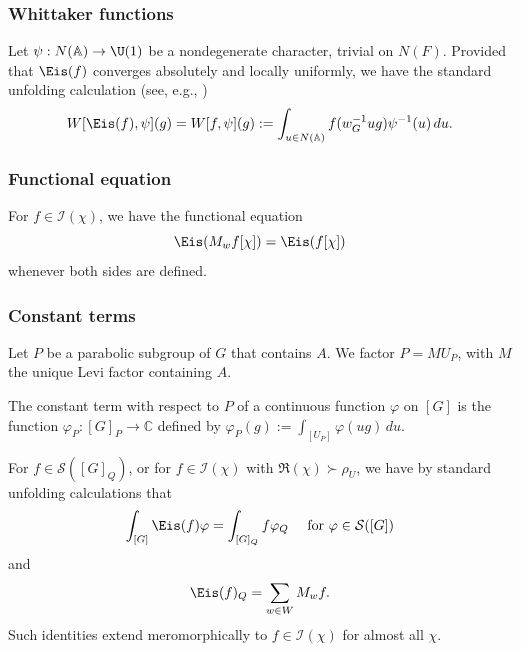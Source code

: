 \subsubsection{Whittaker functions}\label{sec:whittaker-functions}
Let $\psi : N(\mathbb{A}) \rightarrow \U(1)$ be a nondegenerate character, trivial on $N(F)$.  Provided that $\Eis(f)$ converges absolutely and locally uniformly, we have the standard unfolding calculation (see, e.g., \cite[Prop 7.1.3]{MR2683009})
\begin{equation}\label{eq:weisf-psig-=}
  W[\Eis(f),\psi](g) = W[f,\psi](g) := \int_{u \in  N(\mathbb{A})} f(w_G^{-1} u g) \psi^{-1}(u) \, d u.
\end{equation}

\subsubsection{Functional equation}
For $f \in \mathcal{I}(\chi)$, we have the functional equation
\begin{equation}\label{eq:eisenstein-series-functional-equation}
  \Eis(M_w f[\chi]) = \Eis(f[\chi])
\end{equation}
whenever both sides are defined.


\subsubsection{Constant terms}\label{sec:constant-terms}
Let $P$ be a parabolic subgroup of $G$ that contains $A$.  We factor $P = M U_P$, with $M$ the unique Levi factor containing $A$.

The constant term with respect to $P$ of a continuous function $\varphi$ on $[G]$ is the function $\varphi_P : [G]_P \rightarrow \mathbb{C}$ defined by $\varphi_P(g) := \int_{[U_P]} \varphi(u g) \, d u$.


For $f \in \mathcal{S}([G]_Q)$, or for $f \in \mathcal{I}(\chi)$ with $\Re(\chi) \succ \rho_U$, we have by standard unfolding calculations \cite[p101 and \S II.1.7]{MR1361168} that
\begin{equation}\label{eq:int_g-eisf-varphi}
  \int_{[G]} \Eis(f) \varphi = \int_{[G]_Q} f \varphi_Q \quad \text{ for } \varphi \in \mathcal{S}([G])
\end{equation}
and
\begin{equation}\label{eq:eisf_b-=-sum}
  \Eis(f)_Q = \sum_{w \in W} M_w f.
\end{equation}
Such identities extend meromorphically to $f \in \mathcal{I}(\chi)$ for almost all $\chi$.

